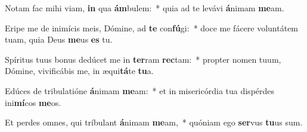 \item Notam fac mihi viam, \textbf{in} qua \textbf{ám}bulem:~* quia ad te levávi \textbf{á}nimam \textbf{me}am.
\item Eripe me de inimícis meis, Dómine, ad \textbf{te} con\textbf{fú}gi:~* doce me fácere voluntátem tuam, quia Deus \textbf{me}us \textbf{es} tu.
\item Spíritus tuus bonus dedúcet me in \textbf{ter}ram \textbf{rec}tam:~* propter nomen tuum, Dómine, vivificábis me, in æqui\textbf{tá}te \textbf{tu}a.
\item Edúces de tribulatióne \textbf{á}nimam \textbf{me}am:~* et in misericórdia tua dispérdes ini\textbf{mí}cos \textbf{me}os.
\item Et perdes omnes, qui tríbulant \textbf{á}nimam \textbf{me}am,~* quóniam ego \textbf{ser}vus \textbf{tu}us sum.

